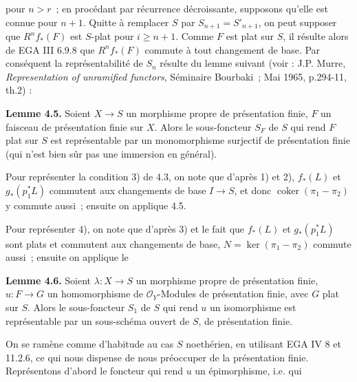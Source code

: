 pour \(n>r\)~; en procédant par récurrence décroissante, supposons qu'elle est connue pour \(n+1\). Quitte à remplacer \(S\) par \(S_{n+1}=S'_{n+1}\), on peut supposer que \(R^nf_*(F)\) est \(S\)-plat pour \(i\ge n+1\). Comme \(F\) est plat sur \(S\), il résulte alors de EGA III 6.9.8 que \(R^nf_*(F)\) commute à tout changement de base. Par conséquent la représentabilité de \(S_n\) résulte du lemme suivant (voir : J.P. Murre, \emph{Representation of unramified functors}, Séminaire Bourbaki~; Mai 1965, p.294-11, th.2) :

\textbf{Lemme 4.5.} Soient \(X\to S\) un morphisme propre de présentation finie, \(F\) un faisceau de présentation finie sur \(X\). Alors le sous-foncteur \(S_F\) de \(S\) qui rend \(F\) plat sur \(S\) est représentable par un monomorphisme surjectif de présentation finie (qui n'est bien sûr pas une immersion en général).

Pour représenter la condition 3) de 4.3, on note que d'après 1) et 2), \(f_*(L)\) et \(g_*(p_1^*L)\) commutent aux changements de base \(I\to S\), et donc \(\operatorname{coker}(\pi_1-\pi_2)\) y commute aussi~; ensuite on applique 4.5.

Pour représenter 4), on note que d'après 3) et le fait que \(f_*(L)\) et \(g_*(p_1^*L)\) sont plats et commutent aux changements de base, \(N=\ker(\pi_1-\pi_2)\) commute aussi~; ensuite on applique le

\textbf{Lemme 4.6.} Soient \(\lambda:X\to S\) un morphisme propre de présentation finie, \(u:F\to G\) un homomorphisme de \(\mathcal O_Y\)-Modules de présentation finie, avec \(G\) plat sur \(S\). Alors le sous-foncteur \(S_1\) de \(S\) qui rend \(u\) un isomorphisme est représentable par un sous-schéma ouvert de \(S\), de présentation finie.

On se ramène comme d'habitude au cas \(S\) noethérien, en utilisant EGA IV 8 et 11.2.6, ce qui nous dispense de nous préoccuper de la présentation finie. Représentons d'abord le foncteur qui rend \(u\) un épimorphisme, i.e. qui
